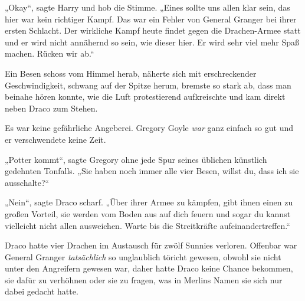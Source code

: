 „Okay“, sagte Harry und hob die Stimme. „Eines sollte uns allen klar sein, das hier war kein richtiger Kampf. Das war ein Fehler von General Granger bei ihrer ersten Schlacht. Der wirkliche Kampf heute findet gegen die Drachen-Armee statt und er wird nicht annähernd so sein, wie dieser hier. Er wird sehr viel mehr Spaß machen. Rücken wir ab.“

\later

Ein Besen schoss vom Himmel herab, näherte sich mit erschreckender Geschwindigkeit, schwang auf der Spitze herum, bremste so stark ab, dass man beinahe hören konnte, wie die Luft protestierend aufkreischte und kam direkt neben Draco zum Stehen.

Es war keine gefährliche Angeberei. Gregory Goyle \emph{war} ganz einfach so gut und er verschwendete keine Zeit.

„Potter kommt“, sagte Gregory ohne jede Spur seines üblichen künstlich gedehnten Tonfalls. „Sie haben noch immer alle vier Besen, willst du, dass ich sie ausschalte?“

„Nein“, sagte Draco scharf. „Über ihrer Armee zu kämpfen, gibt ihnen einen zu großen Vorteil, sie werden vom Boden aus auf dich feuern und sogar du kannst vielleicht nicht allen ausweichen. Warte bis die Streitkräfte aufeinandertreffen.“

Draco hatte vier Drachen im Austausch für zwölf Sunnies verloren. Offenbar war General Granger \emph{tatsächlich} so unglaublich töricht gewesen, obwohl sie nicht unter den Angreifern gewesen war, daher hatte Draco keine Chance bekommen, sie dafür zu verhöhnen oder sie zu fragen, was in Merlins Namen sie sich nur dabei gedacht hatte.

